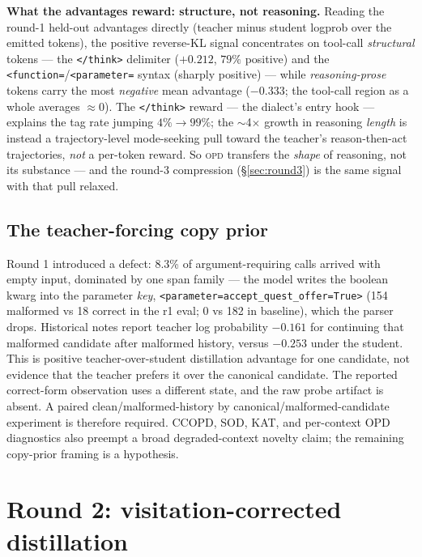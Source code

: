 \documentclass[11pt]{article}
\newcommand{\opd}{\textsc{opd}}
\begin{document}
\textbf{What the advantages reward: structure, not reasoning.} Reading the round-1 held-out
advantages directly (teacher minus student logprob over the emitted tokens), the positive
reverse-KL signal concentrates on tool-call \emph{structural} tokens --- the \texttt{</think>}
delimiter ($+0.212$, $79\%$ positive) and the \texttt{<function=}/\texttt{<parameter=} syntax
(sharply positive) --- while \emph{reasoning-prose} tokens carry the most \emph{negative} mean
advantage ($-0.333$; the tool-call region as a whole averages $\approx$0). The \texttt{</think>}
reward --- the dialect's entry hook --- explains the tag rate jumping $4\%\rightarrow99\%$; the
$\sim$4$\times$ growth in reasoning \emph{length} is instead a trajectory-level mode-seeking pull
toward the teacher's reason-then-act trajectories, \emph{not} a per-token reward. So \opd{} transfers
the \emph{shape} of reasoning, not its substance --- and the round-3 compression
(\S\ref{sec:round3}) is the same signal with that pull relaxed.

\subsection{The teacher-forcing copy prior}
\label{sec:copyprior}
Round 1 introduced a defect: 8.3\% of argument-requiring calls arrived with empty input,
dominated by one span family --- the model writes the boolean kwarg into the parameter
\emph{key}, \texttt{<parameter=accept\_quest\_offer=True>} (154 malformed vs 18 correct in the
r1 eval; 0 vs 182 in baseline), which the parser drops. Historical notes report teacher log
probability $-0.161$ for continuing that malformed candidate after malformed history, versus
$-0.253$ under the student. This is positive teacher-over-student distillation advantage for one
candidate, not evidence that the teacher prefers it over the canonical candidate. The reported
correct-form observation uses a different state, and the raw probe artifact is absent. A paired
clean/malformed-history by canonical/malformed-candidate experiment is therefore required. CCOPD,
SOD, KAT, and per-context OPD diagnostics also preempt a broad degraded-context novelty claim; the
remaining copy-prior framing is a hypothesis.

\section{Round 2: visitation-corrected distillation}
\end{document}
